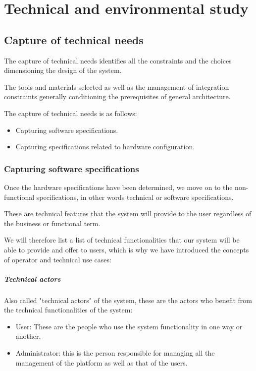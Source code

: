 

\setcounter{mtc}{9}

\chapter{Technical and environmental study}%
\label{chap:chapter_tree}
\minitoc
\section{Capture of technical needs}
The capture of technical needs identifies all the constraints and the choices dimensioning the design of the system.

The tools and materials selected as well as the management of integration constraints generally conditioning the prerequisites of general architecture.

The capture of technical needs is as follows:
\begin{itemize}\addtolength{\itemsep}{-0.35\baselineskip}
      \item
            Capturing software specifications.

      \item
            Capturing specifications related to hardware configuration.

\end{itemize}

\subsection{Capturing software specifications}
Once the hardware specifications have been determined, we move on to the non-functional specifications, in other words technical or software specifications.

These are technical features that the system will provide to the user regardless of the business or functional term.

We will therefore list a list of technical functionalities that our system will be able to provide and offer to users, which is why we have introduced the concepts of operator and technical use cases:

\paragraph{Technical actors}
Also called "technical actors" of the system, these are the actors who benefit from the technical functionalities of the system:
\begin{itemize}\addtolength{\itemsep}{-0.35\baselineskip}
      \item
            User: These are the people who use the system functionality in one way or another.
      \item
            Administrator: this is the person responsible for managing all the management of the platform as well as that of the users.
\end{itemize}

